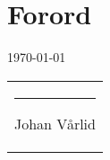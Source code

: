 

\newcommand{\namesig}[2][7cm]{%
  \begin{tabular}{@{}p{#1}@{}}
     \\[2\normalbaselineskip] \hrule
    {#2}
  \end{tabular}
}

\chapter*{Forord}
 



\today






\namesig{Johan Vårlid}


\vfill


